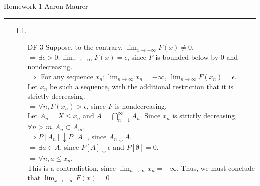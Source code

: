\documentclass[11pt]{article}
\newcommand{\inter}[1]{\bigcap_{#1 =1}^\infty}
\theoremstyle{definition}
\begin{document}
Homework 1 \hfill Aaron Maurer
\vspace{2mm}
\hrule
\vspace{2mm}

\begin{itemize}
    \item[1.1.] 
        \begin{itemize}
            \item[DF 3]
                Suppose, to the contrary, $\lim_{x \to -\infty} F(x) \neq 0$. \\
                $\Rightarrow \exists \epsilon>0: \lim_{x \to -\infty} F(x) = \epsilon$, since $F$ is bounded below by 0 and nondecreasing. \\
                $\Rightarrow$ For any sequence $x_n: \lim_{n \to \infty}x_n = -\infty$, $\lim_{n \to \infty} F(x_n)=\epsilon$. \\
                Let $x_n$ be such a sequence, with the additional restriction that it is strictly decreasing. \\
                $\Rightarrow \forall n, F(x_n)>\epsilon$, since $F$ is nondecreasing. \\
                Let $A_n = {X\leq x_n}$ and $A = \inter{n}A_n$. Since $x_n$ is strictly decreasing, $\forall n>m, A_n \subset A_m$. \\
                $\Rightarrow P[A_n] \downarrow P[A]$, since $A_n \downarrow A$. \\
                $\Rightarrow \exists a \in A$, since $P[A]\downarrow \epsilon$ and $P[\emptyset]=0$. \\
                $\Rightarrow \forall n, a\leq x_n$. \\
                This is a contradiction, since $\lim_{n \to \infty}x_n = -\infty$. Thus, we must conclude that $\lim_{x \to -\infty} F(x) = 0$ 
                \smallskip


\end{itemize}
\end{itemize}
\end{document}
